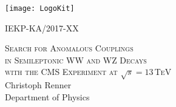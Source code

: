 \begin{titlepage}
  \begin{addmargin}[0cm]{0cm}
    \thispagestyle{empty}
    \vspace{-1cm}
    \begin{center}

	\end{center}
	
  		\begin{minipage}{0.5\textwidth}
  			\texttt{[image: LogoKit]}
  		\end{minipage}%
  		\begin{minipage}{0.5\textwidth}
  			\hspace{3.5cm}IEKP-KA/2017-XX
  		\end{minipage}
  		
	
	\vspace{2cm}
	\begin{center}

	\vspace{0.8cm}

	\Large{\textsc{Search for Anomalous Couplings\\in Semileptonic WW and WZ Decays\\with the CMS Experiment at $\sqrt{s}=13$\,TeV}}\\
	\vspace{0.9cm}
	\Large{Christoph Renner}\\
	\vspace{0.9cm}
	\vspace{1cm}
	\large{Department of Physics\\
  
}
\end{center}
\end{addmargin}
\end{titlepage}
